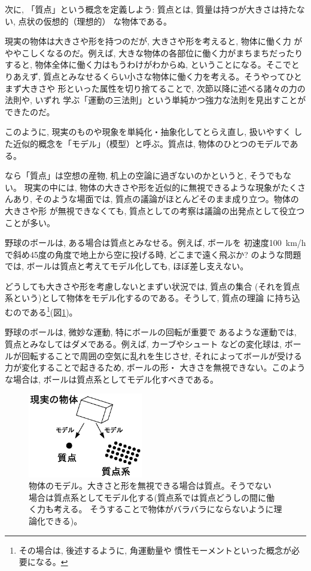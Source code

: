 次に, 「質点」という概念を定義しよう: 
質点とは, 質量は持つが大きさは持たない, 点状の仮想的（理想的）
な物体である。

現実の物体は大きさや形を持つのだが, 大きさや形を考えると, 物体に働く力
がややこしくなるのだ。例えば, 大きな物体の各部位に働く力がまちまちだったりすると, 
物体全体に働く力はもうわけがわからぬ, ということになる。そこでとりあえず, 
質点とみなせるくらい小さな物体に働く力を考える。そうやってひとまず大きさや
形といった属性を切り捨てることで, 次節以降に述べる諸々の力の法則や, いずれ
学ぶ「運動の三法則」という単純かつ強力な法則を見出すことができたのだ。

このように, 現実のものや現象を単純化・抽象化してとらえ直し, 扱いやすく
した近似的概念を「モデル」（模型）と呼ぶ。質点は, 
物体のひとつのモデルである。

なら「質点」は空想の産物, 机上の空論に過ぎないのかというと, そうでもない。
現実の中には, 物体の大きさや形を近似的に無視できるような現象がたくさんあり, 
そのような場面では, 質点の議論がほとんどそのまま成り立つ。物体の大きさや形
が無視できなくても, 質点としての考察は議論の出発点として役立つことが多い。

\begin{exmpl} 野球のボールは, ある場合は質点とみなせる。例えば, ボールを
初速度100~km/hで斜め45度の角度で地上から空に投げる時, どこまで遠く飛ぶか?
のような問題では, ボールは質点と考えてモデル化しても, ほぼ差し支えない。
\end{exmpl}

どうしても大きさや形を考慮しないとまずい状況では, 質点の集合
(それを質点系という)として物体をモデル化するのである。そうして, 質点の理論
に持ち込むのである\footnote{その場合は, 後述するように, 角運動量や
慣性モーメントといった概念が必要になる。}(図\ref{fig:particle})。\mv

\begin{exmpl} 野球のボールは, 微妙な運動, 特にボールの回転が重要で
あるような運動では, 質点とみなしてはダメである。例えば, カーブやシュート
などの変化球は, ボールが回転することで周囲の空気に乱れを生じさせ, 
それによってボールが受ける力が変化することで起きるため, ボールの形・
大きさを無視できない。このような場合は, ボールは質点系としてモデル化すべきである。
\end{exmpl}

\begin{figure}[h]
    \centering
    \includegraphics[width=5cm]{particle.eps}
    \caption{物体のモデル。大きさと形を無視できる場合は質点。そうでない
場合は質点系としてモデル化する(質点系では質点どうしの間に働く力も考える。
そうすることで物体がバラバラにならないように理論化できる)。}\label{fig:particle}
\end{figure}

